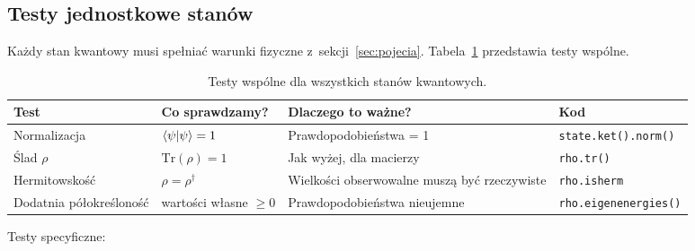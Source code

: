 \documentclass[12pt,a4paper]{article}
\begin{document}
\subsection{Testy jednostkowe stanów}

Każdy stan kwantowy musi spełniać warunki fizyczne z~sekcji~\ref{sec:pojecia}. Tabela~\ref{tab:testy-wspolne} przedstawia testy wspólne.

\begin{table}[htbp]
\centering
\caption{Testy wspólne dla wszystkich stanów kwantowych.}
\label{tab:testy-wspolne}
\begin{tabular}{@{}p{3cm}p{3cm}p{4cm}p{4.5cm}@{}}
\toprule
\textbf{Test} & \textbf{Co sprawdzamy?} & \textbf{Dlaczego to ważne?} & \textbf{Kod} \\
\midrule
Normalizacja & $\braket{\psi|\psi} = 1$ & Prawdopodobieństwa = 1 & \texttt{state.ket().norm()} \\
\addlinespace
Ślad $\rho$ & $\mathrm{Tr}(\rho) = 1$ & Jak wyżej, dla macierzy & \texttt{rho.tr()} \\
\addlinespace
Hermitowskość & $\rho = \rho^\dagger$ & Wielkości obserwowalne muszą być rzeczywiste & \texttt{rho.isherm} \\
\addlinespace
Dodatnia półokreśloność & wartości własne $\geq 0$ & Prawdopodobieństwa nieujemne & \texttt{rho.eigenenergies()} \\
\bottomrule
\end{tabular}
\end{table}

Testy specyficzne:
\end{document}
